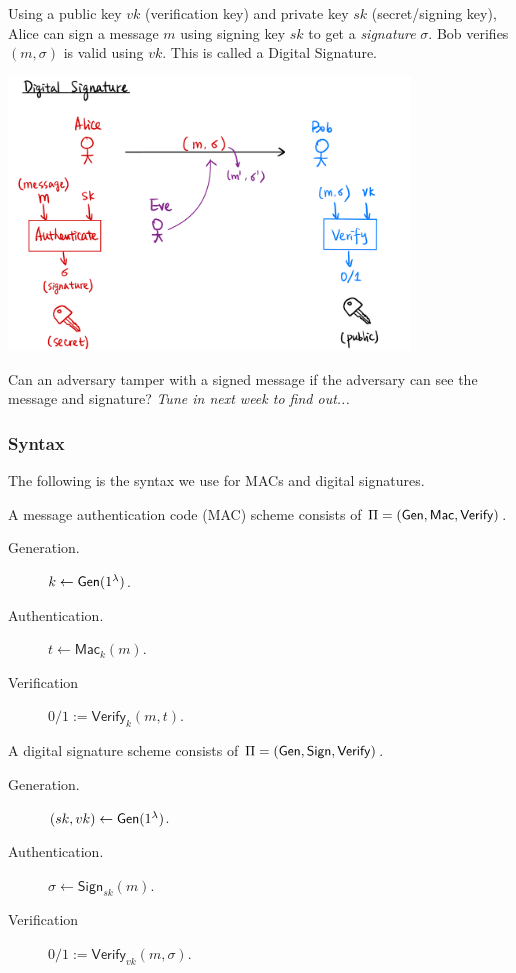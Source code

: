 Using a public key $vk$ (verification key) and private key $sk$ (secret/signing key), Alice can sign a message $m$ using signing key $sk$ to get a \emph{signature} $\sigma$. Bob verifies $(m, \sigma)$ is valid using $vk$. This is called a Digital Signature.

\begin{center}
    \includegraphics[width=0.8\textwidth]{images/2023-02-02/signature.png}
\end{center}

\begin{ques*}
    Can an adversary tamper with a signed message if the adversary can see the message and signature? \emph{Tune in next week to find out...}
\end{ques*}

\subsubsection{Syntax}\label{sec:message-integrity:syntax}
The following is the syntax we use for MACs and digital signatures.

A message authentication code (MAC) scheme consists of $\Pi = (\operatorname{\mathsf{Gen}}, \mathsf{Mac}, \mathsf{Verify})$.
\begin{description}
    \item[Generation.] $k\leftarrow \operatorname{\mathsf{Gen}}(1^\lambda)$.
    \item[Authentication.] $t \leftarrow \mathsf{Mac}_k(m)$.
    \item[Verification] $0/1 := \mathsf{Verify}_k(m, t)$.
\end{description}

A digital signature scheme consists of $\Pi = (\operatorname{\mathsf{Gen}}, \mathsf{Sign}, \mathsf{Verify})$.
\begin{description}
    \item[Generation.] $(sk, vk)\leftarrow \operatorname{\mathsf{Gen}}(1^\lambda)$.
    \item[Authentication.] $\sigma \leftarrow \mathsf{Sign}_{sk}(m)$.
    \item[Verification] $0/1 := \mathsf{Verify}_{vk}(m, \sigma)$.
\end{description}
